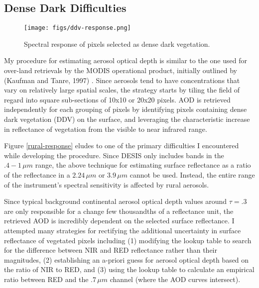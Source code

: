 \documentclass[12pt]{article}
\begin{document}
\subsection{Dense Dark Difficulties}

\begin{figure}[h!]
    \centering
    \begin{center}
        \texttt{[image: figs/ddv-response.png]}
    \end{center}
    \caption{Spectral response of pixels selected as dense dark vegetation.}
    \label{ddv-response}
\end{figure}


My procedure for estimating aerosol optical depth is similar to the one used for over-land retrievals by the MODIS operational product, initially outlined by (Kaufman and Tanre, 1997) \cite{remer_modis_2005}\cite{kaufman_operational_1997}. Since aerosols tend to have concentrations that vary on relatively large spatial scales, the strategy starts by tiling the field of regard into square sub-sections of 10x10 or 20x20 pixels. AOD is retrieved independently for each grouping of pixels by identifying pixels containing dense dark vegetation (DDV) on the surface, and leveraging the characteristic increase in reflectance of vegetation from the visible to near infrared range.

Figure \ref{rural-response} eludes to one of the primary difficulties I encountered while developing the procedure. Since DESIS only includes bands in the $.4-1\,\si{\mu m}$ range, the above technique for estimating surface reflectance as a ratio of the reflectance in a $2.24\,\si{\mu m}$ or $3.9\,\si{\mu m}$ cannot be used. Instead, the entire range of the instrument's spectral sensitivity is affected by rural aerosols.

Since typical background continental aerosol optical depth values around $\tau = .3$ are only responsible for a change few thousandths of a reflectance unit, the retrieved AOD is incredibly dependent on the selected surface reflectance. I attempted many strategies for rectifying the additional uncertainty in surface reflectance of vegetated pixels including (1) modifying the lookup table to search for the difference between NIR and RED reflectance rather than their magnitudes, (2) establishing an a-priori guess for aerosol optical depth based on the ratio of NIR to RED, and (3) using the lookup table to calculate an empirical ratio between RED and the $.7\,\si{\mu m}$ channel (where the AOD curves intersect).
\end{document}
